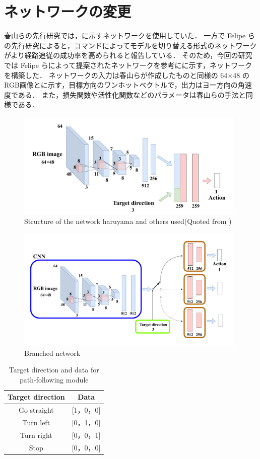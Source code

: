 \section{ネットワークの変更}
春山らの先行研究では，に示すネットワークを使用していた．
一方で Felipe らの先行研究によると，コマンドによってモデルを切り替える形式のネットワークがより経路追従の成功率を高められると報告している．
そのため，今回の研究では Felipe らによって提案されたネットワークを参考にに示す，ネットワークを構築した．
ネットワークの入力は春山らが作成したものと同様の 64×48 の RGB画像とに示す，目標方向のワンホットベクトルで，出力はヨー方向の角速度である．
また，損失関数や活性化関数などのパラメータは春山らの手法と同様である．

\begin{figure}[htbp]
  \centering
  \includegraphics[width=110mm]{images/pdf/haruyama/net.pdf}
  \caption[Structure of the network haruyama and others used]{Structure of the network haruyama and others used(Quoted from \cite{fujiwara2023})}
  \label{fig:haruyama_net}
\end{figure}

\begin{figure}[htbp]
  \centering
   \includegraphics[width=110mm]{images/pdf/ishiguro/branched.pdf}
   \caption{Branched network}
   \label{fig:branched}
\end{figure}

\begin{table}[htbp]
  \centering
  \caption{Target direction and data for path-following module}\label{tab:cmd_dir}
  \begin{tabular}{|c|c|}
  \hline
  Target direction & Data        \\
  \hline
  Go straight   & {[}1，0，0{]} \\
  Turn left   & {[}0，1，0{]} \\
  Turn right   & {[}0，0，1{]} \\
  Stop   & {[}0，0，0{]}\\
  \hline
  \end{tabular}
\end{table}

\clearpage